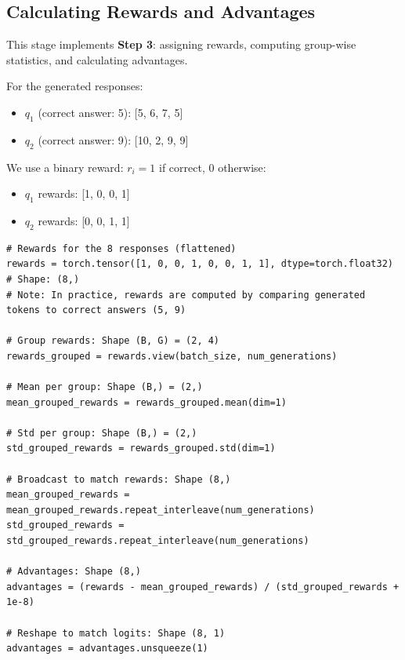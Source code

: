 \documentclass{article}
\begin{document}
\subsection*{Calculating Rewards and Advantages}

This stage implements \textbf{Step 3}: assigning rewards, computing group-wise statistics, and calculating advantages.

For the generated responses:
\begin{itemize}
  \item \( q_1 \) (correct answer: 5): [5, 6, 7, 5]
  \item \( q_2 \) (correct answer: 9): [10, 2, 9, 9]
\end{itemize}

We use a binary reward: \( r_i = 1 \) if correct, \( 0 \) otherwise:
\begin{itemize}
  \item \( q_1 \) rewards: [1, 0, 0, 1]
  \item \( q_2 \) rewards: [0, 0, 1, 1]
\end{itemize}

\begin{verbatim}
# Rewards for the 8 responses (flattened)
rewards = torch.tensor([1, 0, 0, 1, 0, 0, 1, 1], dtype=torch.float32)  # Shape: (8,)
# Note: In practice, rewards are computed by comparing generated tokens to correct answers (5, 9)

# Group rewards: Shape (B, G) = (2, 4)
rewards_grouped = rewards.view(batch_size, num_generations)

# Mean per group: Shape (B,) = (2,)
mean_grouped_rewards = rewards_grouped.mean(dim=1)

# Std per group: Shape (B,) = (2,)
std_grouped_rewards = rewards_grouped.std(dim=1)

# Broadcast to match rewards: Shape (8,)
mean_grouped_rewards = mean_grouped_rewards.repeat_interleave(num_generations)
std_grouped_rewards = std_grouped_rewards.repeat_interleave(num_generations)

# Advantages: Shape (8,)
advantages = (rewards - mean_grouped_rewards) / (std_grouped_rewards + 1e-8)

# Reshape to match logits: Shape (8, 1)
advantages = advantages.unsqueeze(1)
\end{verbatim}
\end{document}
